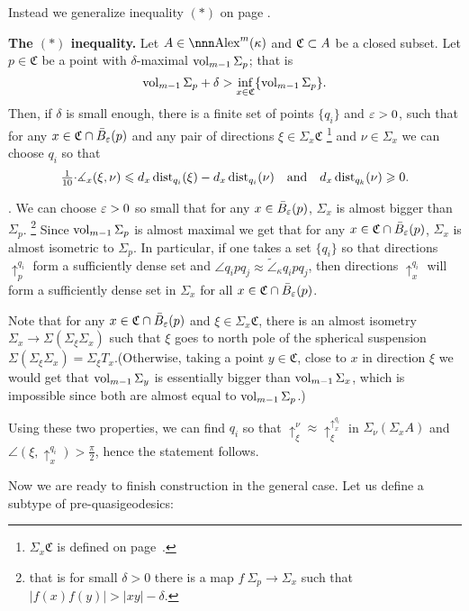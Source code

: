 \documentclass{article}
\begin{document}
Instead we generalize inequality $(*)$ on page \pageref{inq:*}.


\begin{thm}{\bf The $\mathbf{(*)}$ inequality.} \label{inq:di-inq}
Let $A\in\Alex^m(\kappa)$ and $\mathfrak C\subset A$ be a closed subset.
Let $p\in \mathfrak C$ be a point with  $\delta$-maximal $\operatorname{vol}_{m-1} \Sigma_p$;
that is
$$\operatorname{vol}_{m-1} \Sigma_p+\delta
>
\inf_{x\in\mathfrak C}\{\operatorname{vol}_{m-1} \Sigma_p\}.$$ 
Then, if $\delta$ is small enough, there is a finite set of points $\{q_i\}$ and
$\varepsilon>0$, such that for any $x\in\mathfrak C\cap \bar B_\varepsilon(p)$ and any pair of directions $\xi\in \Sigma_x\mathfrak C$%
\footnote{$\Sigma_x\mathfrak C$ is defined on page~\pageref{U_pX}.} 
and $\nu\in \Sigma_x$ we can choose $q_i$ so that 
$$\tfrac{1}{10}{\cdot}\measuredangle_x(\xi,\nu)
\leqslant 
d_x\operatorname{dist}_{q_i}(\xi)-d_x\operatorname{dist}_{q_i}(\nu)\ \ \
\text{and}\ \ \ d_x\operatorname{dist}_{q_k}(\nu)\geqslant0.$$
\end{thm}

\Proof. 
We can choose $\varepsilon>0$ so small that for any $x\in \bar B_\varepsilon(p)$, 
$\Sigma_x$ is almost bigger than $\Sigma_p$.%
\footnote{that is for small $\delta>0$ there is a
map $f\:\Sigma_p\to \Sigma_x$ such that $|f(x)f(y)|>|x y|-\delta$.} 
Since $\operatorname{vol}_{m-1} \Sigma_p$ is almost maximal we get that for any 
$x\in  \mathfrak C\cap \bar B_\varepsilon(p)$, $\Sigma_x$ is almost isometric to $\Sigma_p$.
In particular, if one takes a set $\{q_i\}$ so that directions $\uparrow_p^{q_i}$
form a sufficiently dense set and $\angle q_i p q_j\approx\tilde\angle_\kappa q_i
p q_j$, then directions $\uparrow_x^{q_i}$ will form a sufficiently dense set in
$\Sigma_x$ for all $x\in\mathfrak C\cap \bar B_\varepsilon(p)$.

Note that for any $x\in  \mathfrak C\cap \bar B_\varepsilon(p)$ and $\xi\in
\Sigma_x\mathfrak C$,  there is an almost isometry $\Sigma_x\to \Sigma(\Sigma_\xi \Sigma_x)$ such
that $\xi$ goes to north pole of the spherical suspension $\Sigma(\Sigma_\xi \Sigma_x)=\Sigma_\xi
T_x$.(Otherwise, taking a point $y\in \mathfrak C$, close to $x$ in direction
$\xi$ we would get that $\operatorname{vol}_{m-1}\Sigma_y$ is essentially bigger than
$\operatorname{vol}_{m-1}\Sigma_x$, which is impossible since both are almost equal to
$\operatorname{vol}_{m-1}\Sigma_p$.)

Using these two properties, we can find $q_i$ so that 
$\uparrow^\nu_\xi\approx\uparrow_\xi^{\uparrow_x^{q_i}}$ 
in $\Sigma_\nu (\Sigma_x A)$ and
$\angle(\xi,\uparrow_x^{q_i})>\tfrac\pi2$, hence the statement follows.
\qeds



Now we are ready to finish construction in the general case. 
Let us define a subtype
of pre-quasigeodesics:
\end{document}
